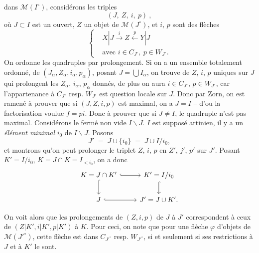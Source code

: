 \documentclass[11pt]{article}
\newcommand{\printedpage}[1]{\marginpar{\footnotesize p.~#1}}
\newcommand{\msp}[1]{\marginpar{\footnotesize [#1]}}
\begin{document}
\printedpage{24}

\msp{45}dans $\mathcal{M}(I^\circ)$, considérons les triples
\[
(J,\ Z,\ i,\ p)\ ,
\]
où $J\subset I$ est un ouvert, $Z$ un objet de $\mathcal{M}(J^\circ)$, et $i$, $p$ sont des flèches
\[
\left\{
\begin{aligned}
& X|J \xrightarrow{\ i\ } Z \xleftarrow{\ p\ } Y|J \\
& \text{avec } i\in C_{J^\circ},\ p\in W_{J^\circ}.
\end{aligned}
\right.
\]
On ordonne les quadruples par prolongement. Si on a un ensemble totalement ordonné, de $(J_\alpha,Z_\alpha,i_\alpha,p_\alpha)$, posant $J=\bigcup I_\alpha$, on trouve de $Z$, $i$, $p$ uniques sur $J$ qui prolongent %
les $Z_\alpha$, $i_\alpha$, $p_\alpha$ donnés, de plus on aura $i\in C_{J^\circ}$, $p\in W_{J^\circ}$, car l'appartenance à $C_{J^\circ}$ resp. $W_{J^\circ}$ est question locale sur $J$. Donc par Zorn, on est ramené à prouver que si $(J,Z,i,p)$ est maximal, on a $J=I$ – d'ou la factorisation voulue $f=pi$. Donc à prouver que si %
$J\neq I$, le quadruple n'est pas maximal. Considérons le fermé non vide $I\backslash J$. $I$ est supposé artinien, il y a un \textit{élément minimal} $i_0$ de $I\backslash J$. Posons
\msp{46}
\[
J' \;=\; J\cup\{i_0\} \;=\; J\cup I/i_0,
\]
et montrons qu'on peut prolonger le triplet $Z$, $i$, $p$ en $Z'$, $j'$, $p'$ sur $J'$. Posant $K'=I/i_0$, %
$K=J\cap K=I_{<i_0}$, on a donc %
\[
\begin{tikzcd}
K=J\cap K' \arrow[r, hook] \arrow[d, hook] & K'=I/i_0 \arrow[d, hook] \\
J \arrow[r, hook] & J'=J\cup K'.
\end{tikzcd}
\]

On voit alors que les prolongements de $(Z,i,p)$ de $J$ à $J'$ correspondent à ceux de $(Z|K',i|K',p|K')$ à $K$. Pour ceci, on note que pour une flèche $\varphi$ d'objets de $\mathcal{M}(J'^\circ)$, cette flèche est dans $C_{J'^\circ}$ resp. $W_{J'^\circ}$, si et seulement si ses restrictions à $J$ et à $K'$ le sont.
\end{document}
